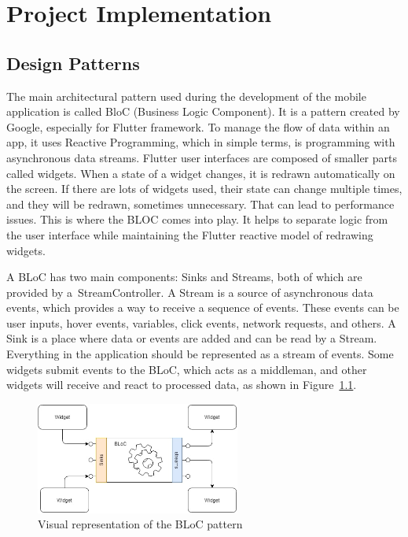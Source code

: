 \chapter{Project Implementation}
\section{Design Patterns}
The main architectural pattern used during the development of the mobile application is called BloC (Business Logic Component). It is a pattern created by Google, especially for Flutter framework. To manage the flow of data within an app, it uses Reactive Programming, which in simple terms, is programming with asynchronous data streams. Flutter user interfaces are composed of smaller parts called widgets. When a state of a widget changes, it is redrawn automatically on the screen. If there are lots of widgets used, their state can change multiple times, and they will be redrawn, sometimes unnecessary. That can lead to performance issues. This is where the BLOC comes into play. It helps to separate logic from the user interface while maintaining the Flutter reactive model of redrawing widgets.

A BLoC has two main components: Sinks and Streams, both of which are provided by a~StreamController. A Stream is a source of asynchronous data events, which provides a way to receive a sequence of events. These events can be user inputs, hover events, variables, click events, network requests, and others. A Sink is a place where data or events are added and can be read by a Stream. Everything in the application should be represented as a stream of events. Some widgets submit events to the BLoC, which acts as a middleman, and other widgets will receive and react to processed data, as shown in Figure~\ref{fig:bloc-pattern}.

\begin{figure}[htb]
    \centering
    \includegraphics[width=0.6\textwidth]{fig04/bloc_pattern.png}
    \caption{Visual representation of the BLoC pattern} \label{fig:bloc-pattern}
\end{figure}

